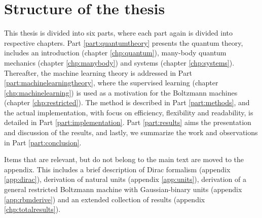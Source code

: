 \section{Structure of the thesis}
This thesis is divided into six parts, where each part again is divided into respective chapters. Part \ref{part:quantumtheory} presents the quantum theory, includes an introduction (chapter \ref{chp:quantum}), many-body quantum mechanics (chapter \ref{chp:manybody}) and systems (chapter \ref{chp:systems}). Thereafter, the machine learning theory is addressed in Part \ref{part:machinelearningtheory}, where the supervised learning (chapter \ref{chp:machinelearning}) is used as a motivation for the Boltzmann machines (chapter \ref{chp:restricted}). The method is described in Part \ref{part:methods}, and the actual implementation, with focus on efficiency, flexibility and readability, is detailed in Part \ref{part:implementation}. Part \ref{part:results} aims the presentation and discussion of the results, and lastly, we summarize the work and observations in Part \ref{part:conclusion}. 

Items that are relevant, but do not belong to the main text are moved to the appendix. This includes a brief description of Dirac formalism (appendix \ref{app:dirac}), derivation of natural units (appendix \ref{app:units}), derivation of a general restricted Boltzmann machine with Gaussian-binary units (appendix \ref{app:rbmderive}) and an extended collection of results (appendix \ref{chp:totalresults}).
